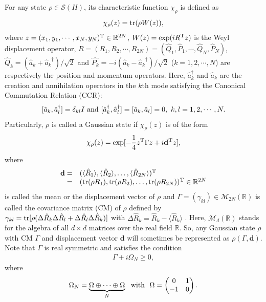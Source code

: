 \documentclass[10pt,aps,pra,amsfonts,amssymb,amsmath,%
floatfix,nofootinbib, groupedaddress,superscriptaddress,citesort,twocolumn
]{revtex4}%
\begin{document}
 For any state $\rho\in\mathcal{S}(H)$, its characteristic function $\chi_{\rho}$ is
 defined as
$$\chi_{\rho}(z)={\rm tr}(\rho W(z)),$$ where
$z=(x_{1}, y_{1}, \cdots, x_{N}, y_{N})^{\rm T}\in{\mathbb R}^{2N}$,
$W(z)=\exp(i{R}^{\rm T}z)$ is the Weyl displacement operator,
${R}=(R_1,R_2,\cdots,R_{2N})=(\hat{Q}_1,\hat{P}_1,\cdots,\hat{Q}_N,\hat{P}_N)$,
$\hat{Q}_k=(\hat{a}_k+{\hat{a}_k}^\dag)/\sqrt{2}$
and
$\hat{P_k}=-i({\hat{a}_k}-{\hat{a}_k}^\dag)/\sqrt{2}$
($k=1,2,\cdots,N$) are respectively the position and momentum operators. Here,
$\hat{a}_k^\dag$ and
$\hat{a}_k$ are the creation and annihilation operators in the $k$th
mode satisfying the Canonical Commutation Relation (CCR):
$$[\hat{a}_k,\hat{a}_l^\dag]=\delta_{kl}I\ {\rm and}
\ [\hat{a}_k^\dag,\hat{a}_l^\dag]=[\hat{a}_k,\hat{a}_l]=0,\ k,l=1,2,\cdots,N.$$ Particularly,  $\rho$ is called a Gaussian state
if $\chi_{\rho}(z)$ is of the form
\begin{eqnarray*}\label{N1}
	\chi_{\rho}(z)=\exp[-\frac{1}{4}z^{\rm T}\Gamma z+i{\mathbf
		d}^{\rm T}z],
\end{eqnarray*}
where  $$
\begin{array}{rl}{\mathbf d}=&(\langle\hat R_1 \rangle, \langle\hat R_2
\rangle, \ldots ,\langle\hat R_{2N} \rangle)^{\rm T}\\
=&({\rm tr}(\rho
R_1), {\rm tr}(\rho R_2), \ldots, {\rm tr}(\rho R_{2N}))^{\rm
	T}\in{\mathbb R}^{2N}\end{array}$$ is called the mean or the displacement
vector of $\rho$ and $\Gamma=(\gamma_{kl})\in \mathcal M_{2N}(\mathbb R)$ is called
the covariance matrix (CM) of $\rho$ defined by $\gamma_{kl}={\rm
	tr}[\rho
(\Delta\hat{R}_k\Delta\hat{R}_l+\Delta\hat{R}_l\Delta\hat{R}_k)]$
with $\Delta\hat{R}_k=\hat{R}_k-\langle\hat{R}_k\rangle$
\cite{SLP}. Here, $\mathcal M_d(\mathbb R)$ stands for the algebra of all
$d\times d$ matrices over the real field $\mathbb R$.
So,  any Gaussian state $\rho$ with CM $\Gamma$ and displacement
vector ${\mathbf d}$ will sometimes be represented as $\rho(\Gamma, {\mathbf	d})$.
Note that  $\Gamma$ is real symmetric and satisfies the
condition
\begin{eqnarray*}\label{relation1}
\Gamma +i\Omega_N\geq 0,
\end{eqnarray*}
where
$$ \Omega_N=\underbrace{\Omega\oplus\cdots\oplus\Omega}_{N} \ \ {\rm with}\ \ \Omega=\begin{pmatrix}0&1\\-1&0\end{pmatrix}.$$
\end{document}

